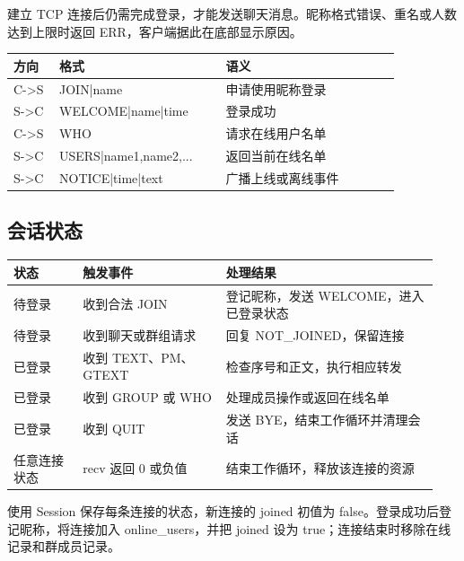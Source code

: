 \documentclass[UTF8,a4paper,10pt,fontset=fandol]{ctexart}
\begin{document}
建立 TCP 连接后仍需完成登录，才能发送聊天消息。昵称格式错误、重名或人数达到上限时返回 ERR，客户端据此在底部显示原因。

\par\medskip\noindent\begin{minipage}{\linewidth}\centering
\begin{tabular}{@{}>{\raggedright\arraybackslash}p{0.113\linewidth}>{\raggedright\arraybackslash}p{0.403\linewidth}>{\raggedright\arraybackslash}p{0.422\linewidth}@{}}
\toprule
方向 & 格式 & 语义\\
\midrule
C->S & JOIN|\allowbreak{}name & 申请使用昵称登录\\
S->C & WELCOME|\allowbreak{}name|\allowbreak{}time & 登录成功\\
C->S & WHO & 请求在线用户名单\\
S->C & USERS|\allowbreak{}name1,name2,... & 返回当前在线名单\\
S->C & NOTICE|\allowbreak{}time|\allowbreak{}text & 广播上线或离线事件\\
\bottomrule
\end{tabular}
\end{minipage}\par\medskip
\subsection{会话状态}
\par\medskip\noindent\begin{minipage}{\linewidth}\centering
\begin{tabular}{@{}>{\raggedright\arraybackslash}p{0.159\linewidth}>{\raggedright\arraybackslash}p{0.319\linewidth}>{\raggedright\arraybackslash}p{0.460\linewidth}@{}}
\toprule
状态 & 触发事件 & 处理结果\\
\midrule
待登录 & 收到合法 JOIN & 登记昵称，发送 WELCOME，进入已登录状态\\
待登录 & 收到聊天或群组请求 & 回复 NOT\_JOINED，保留连接\\
已登录 & 收到 TEXT、PM、GTEXT & 检查序号和正文，执行相应转发\\
已登录 & 收到 GROUP 或 WHO & 处理成员操作或返回在线名单\\
已登录 & 收到 QUIT & 发送 BYE，结束工作循环并清理会话\\
任意连接状态 & recv 返回 0 或负值 & 结束工作循环，释放该连接的资源\\
\bottomrule
\end{tabular}
\end{minipage}\par\medskip
使用 Session 保存每条连接的状态，新连接的 joined 初值为 false。登录成功后登记昵称，将连接加入 online\_users，并把 joined 设为 true；连接结束时移除在线记录和群成员记录。
\end{document}
